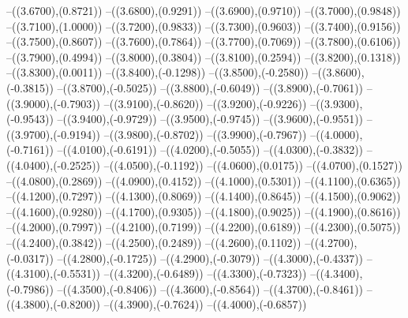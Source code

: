 {	--({\sx*(3.6700)},{\sy*(0.8721)})
	--({\sx*(3.6800)},{\sy*(0.9291)})
	--({\sx*(3.6900)},{\sy*(0.9710)})
	--({\sx*(3.7000)},{\sy*(0.9848)})
	--({\sx*(3.7100)},{\sy*(1.0000)})
	--({\sx*(3.7200)},{\sy*(0.9833)})
	--({\sx*(3.7300)},{\sy*(0.9603)})
	--({\sx*(3.7400)},{\sy*(0.9156)})
	--({\sx*(3.7500)},{\sy*(0.8607)})
	--({\sx*(3.7600)},{\sy*(0.7864)})
	--({\sx*(3.7700)},{\sy*(0.7069)})
	--({\sx*(3.7800)},{\sy*(0.6106)})
	--({\sx*(3.7900)},{\sy*(0.4994)})
	--({\sx*(3.8000)},{\sy*(0.3804)})
	--({\sx*(3.8100)},{\sy*(0.2594)})
	--({\sx*(3.8200)},{\sy*(0.1318)})
	--({\sx*(3.8300)},{\sy*(0.0011)})
	--({\sx*(3.8400)},{\sy*(-0.1298)})
	--({\sx*(3.8500)},{\sy*(-0.2580)})
	--({\sx*(3.8600)},{\sy*(-0.3815)})
	--({\sx*(3.8700)},{\sy*(-0.5025)})
	--({\sx*(3.8800)},{\sy*(-0.6049)})
	--({\sx*(3.8900)},{\sy*(-0.7061)})
	--({\sx*(3.9000)},{\sy*(-0.7903)})
	--({\sx*(3.9100)},{\sy*(-0.8620)})
	--({\sx*(3.9200)},{\sy*(-0.9226)})
	--({\sx*(3.9300)},{\sy*(-0.9543)})
	--({\sx*(3.9400)},{\sy*(-0.9729)})
	--({\sx*(3.9500)},{\sy*(-0.9745)})
	--({\sx*(3.9600)},{\sy*(-0.9551)})
	--({\sx*(3.9700)},{\sy*(-0.9194)})
	--({\sx*(3.9800)},{\sy*(-0.8702)})
	--({\sx*(3.9900)},{\sy*(-0.7967)})
	--({\sx*(4.0000)},{\sy*(-0.7161)})
	--({\sx*(4.0100)},{\sy*(-0.6191)})
	--({\sx*(4.0200)},{\sy*(-0.5055)})
	--({\sx*(4.0300)},{\sy*(-0.3832)})
	--({\sx*(4.0400)},{\sy*(-0.2525)})
	--({\sx*(4.0500)},{\sy*(-0.1192)})
	--({\sx*(4.0600)},{\sy*(0.0175)})
	--({\sx*(4.0700)},{\sy*(0.1527)})
	--({\sx*(4.0800)},{\sy*(0.2869)})
	--({\sx*(4.0900)},{\sy*(0.4152)})
	--({\sx*(4.1000)},{\sy*(0.5301)})
	--({\sx*(4.1100)},{\sy*(0.6365)})
	--({\sx*(4.1200)},{\sy*(0.7297)})
	--({\sx*(4.1300)},{\sy*(0.8069)})
	--({\sx*(4.1400)},{\sy*(0.8645)})
	--({\sx*(4.1500)},{\sy*(0.9062)})
	--({\sx*(4.1600)},{\sy*(0.9280)})
	--({\sx*(4.1700)},{\sy*(0.9305)})
	--({\sx*(4.1800)},{\sy*(0.9025)})
	--({\sx*(4.1900)},{\sy*(0.8616)})
	--({\sx*(4.2000)},{\sy*(0.7997)})
	--({\sx*(4.2100)},{\sy*(0.7199)})
	--({\sx*(4.2200)},{\sy*(0.6189)})
	--({\sx*(4.2300)},{\sy*(0.5075)})
	--({\sx*(4.2400)},{\sy*(0.3842)})
	--({\sx*(4.2500)},{\sy*(0.2489)})
	--({\sx*(4.2600)},{\sy*(0.1102)})
	--({\sx*(4.2700)},{\sy*(-0.0317)})
	--({\sx*(4.2800)},{\sy*(-0.1725)})
	--({\sx*(4.2900)},{\sy*(-0.3079)})
	--({\sx*(4.3000)},{\sy*(-0.4337)})
	--({\sx*(4.3100)},{\sy*(-0.5531)})
	--({\sx*(4.3200)},{\sy*(-0.6489)})
	--({\sx*(4.3300)},{\sy*(-0.7323)})
	--({\sx*(4.3400)},{\sy*(-0.7986)})
	--({\sx*(4.3500)},{\sy*(-0.8406)})
	--({\sx*(4.3600)},{\sy*(-0.8564)})
	--({\sx*(4.3700)},{\sy*(-0.8461)})
	--({\sx*(4.3800)},{\sy*(-0.8200)})
	--({\sx*(4.3900)},{\sy*(-0.7624)})
	--({\sx*(4.4000)},{\sy*(-0.6857)})
}
